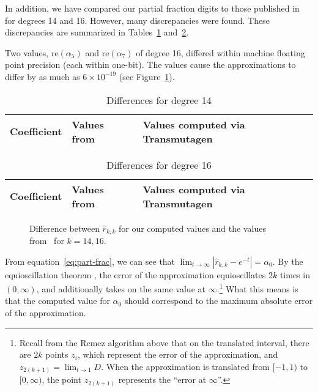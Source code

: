 
In addition, we have compared our partial fraction digits to those published
in~\cite{pusa2012correction} for degrees 14 and 16. However, many
discrepancies were found. These discrepancies are summarized in
Tables~\ref{table:pusa-degree-14} and~\ref{table:pusa-degree-16}.

Two values, $\mathrm{re}(\alpha_5)$ and $\mathrm{re}(\alpha_7)$ of degree 16,
differed within machine floating point precision (each within one-bit). The
values cause the approximations to differ by as much as $6\times10^{-19}$ (see
Figure~\ref{fig:pusa-differences}).

\begin{table}[h!]
\centering
\begin{tabular}{ r l l }
Coefficient & Values from~\cite{pusa2012correction} & Values computed via Transmutagen \\
\hline

\end{tabular}
\caption{Differences for degree 14}
\label{table:pusa-degree-14}
\end{table}

\begin{table}[h!]
\centering
\begin{tabular}{ r l l }
Coefficient & Values from~\cite{pusa2012correction} & Values computed via Transmutagen \\
\hline

\end{tabular}
\caption{Differences for degree 16}
\label{table:pusa-degree-16}
\end{table}

\begin{figure}[!ht]
\centering
\resizebox{0.9\textwidth}{!}{}
\caption{Difference between $\hat{r}_{k,k}$ for our computed values and the
  values from~ for $k=14,16$.}
\label{fig:pusa-differences}
\end{figure}

From equation~\ref{eq:part-frac}, we can see that
$\lim_{t\to\infty}{\left|\hat{r}_{k,k} - e^{-t}\right|} = \alpha_0$. By the
equioscillation theorem , the error of the approximation equioscillates $2k$ times
in $(0, \infty)$, and additionally takes on the same value at $\infty$.\footnote{Recall
from the Remez algorithm above that on the translated interval, there are $2k$
points $z_i$, which represent the error of the approximation, and
$z_{2(k+1)}=\lim_{t\to 1}{D}$. When the approximation is translated from $[-1,
1)$ to $[0, \infty)$, the point $z_{2(k + 1)}$ represents the ``error at
$\infty$''.} What this means is that the computed value for $\alpha_0$ should
correspond to the maximum absolute error of the approximation.

